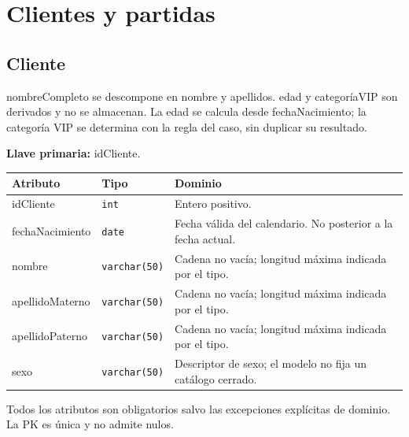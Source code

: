 \section{Clientes y partidas}
\par\noindent\begin{minipage}{\textwidth}
\subsection{Cliente}
nombreCompleto se descompone en nombre y apellidos. edad y categoríaVIP son derivados y no se almacenan. La edad se calcula desde fechaNacimiento; la categoría VIP se determina con la regla del caso, sin duplicar su resultado.\par
\textbf{Llave primaria:} idCliente.\par
{\small\begin{tabular}{@{}p{}p{}p{}@{}}
\toprule Atributo & Tipo & Dominio \\ \midrule
idCliente & \texttt{int} & Entero positivo. \\
fechaNacimiento & \texttt{date} & Fecha válida del calendario. No posterior a la fecha actual. \\
nombre & \texttt{varchar(50)} & Cadena no vacía; longitud máxima indicada por el tipo. \\
apellidoMaterno & \texttt{varchar(50)} & Cadena no vacía; longitud máxima indicada por el tipo. \\
apellidoPaterno & \texttt{varchar(50)} & Cadena no vacía; longitud máxima indicada por el tipo. \\
sexo & \texttt{varchar(50)} & Descriptor de sexo; el modelo no fija un catálogo cerrado. \\
\bottomrule\end{tabular}}
Todos los atributos son obligatorios salvo las excepciones explícitas de dominio. La PK es única y no admite nulos.
\end{minipage}\par\vspace{.35cm}

